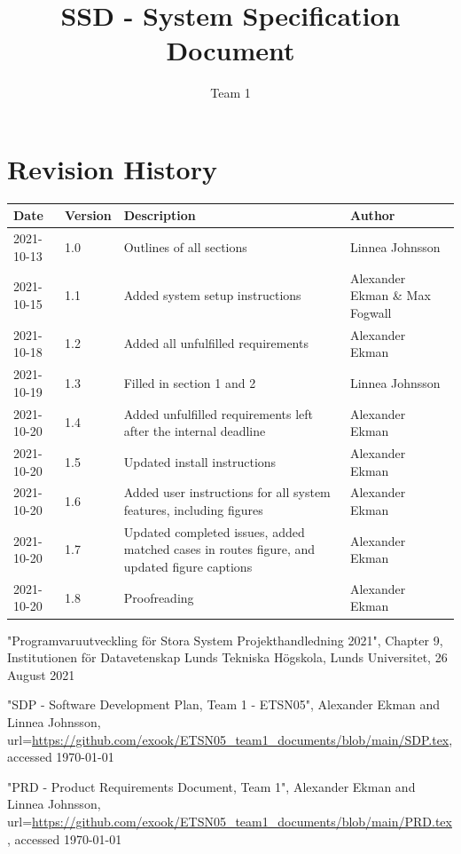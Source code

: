 \documentclass{article}
\title{SSD - System Specification Document}
\author{Team 1}
\begin{document}
\date{}
\maketitle
\thispagestyle{fancy}
\newpage

\section*{Revision History}
\begin{table}[h]
    \centering
    \begin{tabular}{|l|l|p{55mm}|p{35mm}|}
    \hline
    Date & Version & Description & Author \\ 
    \hline\hline 
    2021-10-13 & 1.0 & Outlines of all sections & Linnea Johnsson \\
    \hline
    2021-10-15 & 1.1 & Added system setup instructions & Alexander Ekman \& Max Fogwall  \\
    \hline
    2021-10-18 & 1.2 & Added all unfulfilled requirements & Alexander Ekman \\
    \hline
    2021-10-19 & 1.3 & Filled in section 1 and 2 & Linnea Johnsson \\
    \hline
    2021-10-20 & 1.4 & Added unfulfilled requirements left after the internal deadline & Alexander Ekman \\
    \hline
    2021-10-20 & 1.5 & Updated install instructions & Alexander Ekman \\
    \hline
    2021-10-20 & 1.6 & Added user instructions for all system features, including figures & Alexander Ekman \\
    \hline
    2021-10-20 & 1.7 & Updated completed issues, added matched cases in routes figure, and updated figure captions & Alexander Ekman \\
    \hline
    2021-10-20 & 1.8 & Proofreading & Alexander Ekman \\
    \hline
    \end{tabular}
    \label{tab:history}
\end{table}
\newpage

\begin{thebibliography}{widest entry}

     "Programvaruutveckling för Stora System Projekthandledning 2021", Chapter 9, Institutionen för Datavetenskap Lunds Tekniska Högskola, Lunds Universitet, 26 August 2021
    
     "SDP - Software Development Plan, Team 1 - ETSN05", Alexander Ekman and Linnea Johnsson, url=\url{https://github.com/exook/ETSN05_team1_documents/blob/main/SDP.tex}, accessed \today
    
     "PRD - Product Requirements Document, Team 1", Alexander Ekman and Linnea Johnsson, url=\url{https://github.com/exook/ETSN05_team1_documents/blob/main/PRD.tex}, accessed \today
    
\end{thebibliography}
\newpage
\end{document}
